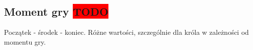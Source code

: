 \subsection{Moment gry \colorbox{red}{TODO}}
\label{subsec:moment-gry}

{
    \color{red}
    \large Początek - środek - koniec.
    Różne wartości, szczególnie dla króla w zależności od momentu gry.
}